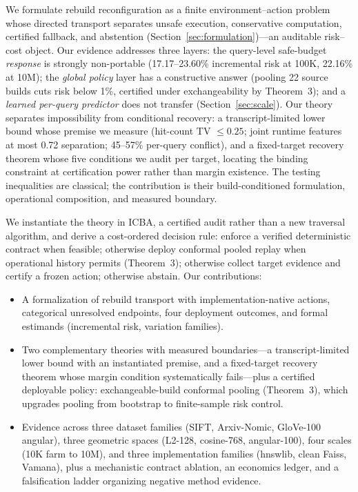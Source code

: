 \documentclass{article}
\begin{document}
We formulate rebuild reconfiguration as a finite environment--action problem whose directed transport
separates unsafe execution, conservative computation, certified fallback, and abstention
(Section~\ref{sec:formulation})---an auditable risk--cost object. Our evidence addresses three layers: the
query-level safe-budget \emph{response} is strongly non-portable (17.17--23.60\% incremental risk at
100K, 22.16\% at 10M); the \emph{global policy} layer has a constructive answer (pooling 22 source builds
cuts risk below 1\%, certified under exchangeability by Theorem~3); and a \emph{learned per-query
predictor} does not transfer (Section~\ref{sec:scale}). Our theory separates impossibility from
conditional recovery: a transcript-limited lower bound whose premise we measure (hit-count TV $\le0.25$;
joint runtime features at most 0.72 separation; 45--57\% per-query conflict), and a fixed-target recovery
theorem whose five conditions we audit per target, locating the binding constraint at certification power
rather than margin existence. The testing inequalities are classical; the contribution is their
build-conditioned formulation, operational composition, and measured boundary.

We instantiate the theory in ICBA, a certified audit rather than a new traversal algorithm, and derive a
cost-ordered decision rule: enforce a verified deterministic contract when feasible; otherwise deploy
conformal pooled replay when operational history permits (Theorem~3); otherwise collect target evidence
and certify a frozen action; otherwise abstain. Our contributions:
\begin{itemize}\itemsep1pt
\item A formalization of rebuild transport with implementation-native actions, categorical unresolved
endpoints, four deployment outcomes, and formal estimands (incremental risk, variation families).
\item Two complementary theories with measured boundaries---a transcript-limited lower bound with an
instantiated premise, and a fixed-target recovery theorem whose margin condition systematically
fails---plus a certified deployable policy: exchangeable-build conformal pooling (Theorem~3), which
upgrades pooling from bootstrap to finite-sample risk control.
\item Evidence across three dataset families (SIFT, Arxiv-Nomic, GloVe-100 angular), three geometric
spaces (L2-128, cosine-768, angular-100), four scales (10K farm to 10M), and three implementation
families (hnswlib, clean Faiss, Vamana), plus a mechanistic contract ablation, an economics ledger, and
a falsification ladder organizing negative method evidence.
\end{itemize}
\end{document}
